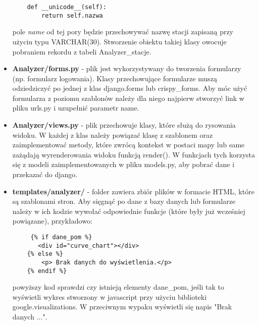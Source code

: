 \begin{itemize}
\begin{verbatim}
    def __unicode__(self):
        return self.nazwa
	\end{verbatim}
pole \textit{name} od tej pory będzie przechowywać nazwę stacji zapisaną przy użyciu typu VARCHAR(30). Stworzenie obiektu takiej klasy owocuje pobraniem rekordu z tabeli Analyzer\_stacje.
	\item \textbf{Analyzer/forms.py} - plik jest wykorzystywany do tworzenia formularzy (np. formularz logowania). Klasy przechowujące formularze muszą odziedziczyć po jednej z klas django.forms lub crispy\_forms. Aby móc użyć formularza z poziomu szablonów należy dla niego najpierw stworzyć link w pliku urls.py i uzupełnić parametr name. 
	\item \textbf{Analyzer/views.py} - plik przechowuje klasy, które służą do rysowania widoku. W każdej z klas należy powiązać klasę z szablonem oraz zaimplementować metody, które zwrócą kontekst w postaci mapy lub same zażądają wyrenderowania widoku funkcją render(). W funkcjach tych korzysta się z modeli zaimplementowanych w pliku models.py, aby pobrać dane i przekazać do django. 
	\item \textbf{templates/analyzer/} - folder zawiera zbiór plików w formacie HTML, które są szablonami stron. Aby sięgnąć po dane z bazy danych lub formularze należy w ich kodzie wywołać odpowiednie funkcje (które były już wcześniej powiązane), przykładowo:
	\begin{verbatim}
	 {% if dane_pom %}
       <div id="curve_chart"></div>
    {% else %}
    	<p> Brak danych do wyświetlenia.</p>
    {% endif %}
	\end{verbatim}
powyższy kod sprawdzi czy istnieją elementy dane\_pom, jeśli tak to wyświetli wykres stworzony w javascript przy użyciu biblioteki google.visualizations. W przeciwnym wypaku wyświetli się napis "Brak danych ...". 
\end{itemize}

